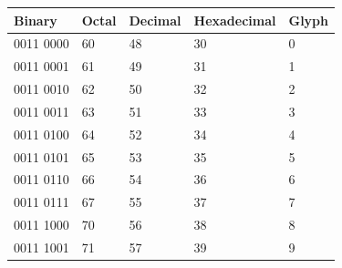\documentclass{article}
\begin{document}
\begin{tabular}{lllll}
\toprule
Binary & Octal & Decimal & Hexadecimal & Glyph \\
\midrule
0011 0000 & 60 & 48 & 30 & 0 \\
0011 0001 & 61 & 49 & 31 & 1 \\
0011 0010 & 62 & 50 & 32 & 2 \\
0011 0011 & 63 & 51 & 33 & 3 \\
0011 0100 & 64 & 52 & 34 & 4 \\
0011 0101 & 65 & 53 & 35 & 5 \\
0011 0110 & 66 & 54 & 36 & 6 \\
0011 0111 & 67 & 55 & 37 & 7 \\
0011 1000 & 70 & 56 & 38 & 8 \\
0011 1001 & 71 & 57 & 39 & 9 \\
\bottomrule
\end{tabular}
\end{document}
